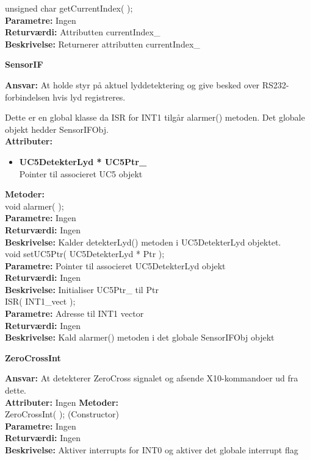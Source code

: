 unsigned char getCurrentIndex( ); \\
\textbf{Parametre:} Ingen \\
\textbf{Returværdi:} Attributten currentIndex\_ \\
\textbf{Beskrivelse:} Returnerer attributten currentIndex\_ \\

%
%
{\centering
\textbf{SensorIF}\par
}
\textbf{Ansvar:} At holde styr på aktuel lyddetektering og give besked over RS232-forbindelsen hvis lyd registreres.

Dette er en global klasse da ISR for INT1 tilgår alarmer() metoden. Det globale objekt hedder SensorIFObj. \\
\textbf{Attributer:}
\begin{itemize}
	\item \textbf{UC5DetekterLyd * UC5Ptr\_} \\
	Pointer til associeret UC5 objekt
\end{itemize}

\textbf{Metoder:} \\
void alarmer( ); \\
\textbf{Parametre:} Ingen \\
\textbf{Returværdi:} Ingen \\
\textbf{Beskrivelse:} Kalder detekterLyd() metoden i UC5DetekterLyd objektet. \\

void setUC5Ptr( UC5DetekterLyd * Ptr ); \\
\textbf{Parametre:} Pointer til associeret UC5DetekterLyd objekt \\
\textbf{Returværdi:} Ingen \\
\textbf{Beskrivelse:} Initialiser UC5Ptr\_ til Ptr \\

ISR( INT1\_vect ); \\
\textbf{Parametre:} Adresse til INT1 vector \\
\textbf{Returværdi:} Ingen \\
\textbf{Beskrivelse:} Kald alarmer() metoden i det globale SensorIFObj objekt \\

%
%
{\centering
\textbf{ZeroCrossInt}\par
}
\textbf{Ansvar:} At detekterer ZeroCross signalet og afsende X10-kommandoer ud fra dette.\\
\textbf{Attributer:} Ingen
\textbf{Metoder:} \\
ZeroCrossInt( ); (Constructor) \\
\textbf{Parametre:} Ingen \\
\textbf{Returværdi:} Ingen \\
\textbf{Beskrivelse:} Aktiver interrupts for INT0 og aktiver det globale interrupt flag \\


